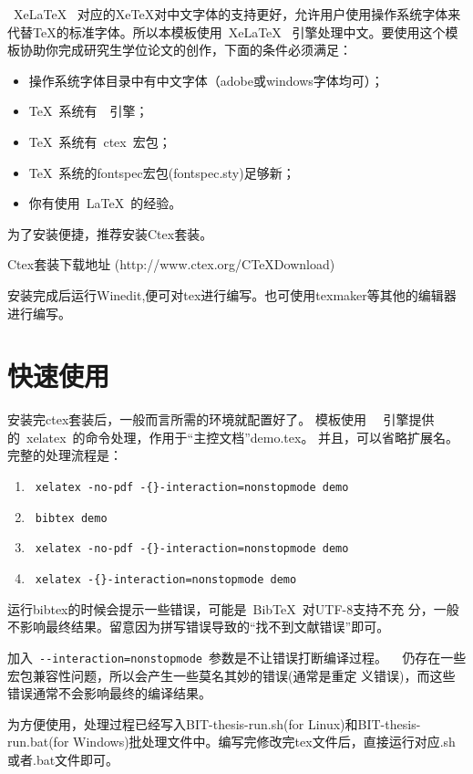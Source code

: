 ~XeLaTeX~ 对应的XeTeX对中文字体的支持更好，允许用户使用操作系统字体来代替TeX的标准字体。所以本模板使用~XeLaTeX~ 引擎处理中文。要使用这个模板协助你完成研究生学位论文的创作，下面的条件必须满足：

\begin{itemize}
\item \inv 操作系统字体目录中有中文字体（adobe或windows字体均可）；
\item \inv \TeX~系统有~\XeTeX~引擎；
\item \inv \TeX~系统有~ctex~宏包；
\item \inv \TeX~系统的fontspec宏包(fontspec.sty)足够新；
\item \inv 你有使用~\LaTeX~的经验。
\end{itemize}

为了安装便捷，推荐安装Ctex套装。

Ctex套装下载地址 (http://www.ctex.org/CTeXDownload)


安装完成后运行Winedit,便可对tex进行编写。也可使用texmaker等其他的编辑器进行编写。

\section{快速使用}
\label{sec:process}

安装完ctex套装后，一般而言所需的环境就配置好了。
模板使用~\XeTeX~ 引擎提供的~xelatex~的命令处理，作用于“主控文档”demo.tex。
并且，可以省略扩展名。完整的处理流程是：

{\color{blue}
\begin{enumerate}
\item[] ~\verb|xelatex -no-pdf -{}-interaction=nonstopmode demo|
\item[] ~\verb|bibtex demo| 
\item[] ~\verb|xelatex -no-pdf -{}-interaction=nonstopmode demo|
\item[] ~\verb|xelatex -{}-interaction=nonstopmode demo|
\end{enumerate}}

运行bibtex的时候会提示一些错误，可能是~{{\sc Bib}\TeX}~对UTF-8支持不充
分，一般不影响最终结果。留意因为拼写错误导致的``找不到文献错误''即可。

加入~\verb|--interaction=nonstopmode|~参数是不让错误打断编译过程。
\XeTeX~ 仍存在一些宏包兼容性问题，所以会产生一些莫名其妙的错误(通常是重定
义错误)，而这些错误通常不会影响最终的编译结果。
  
为方便使用，处理过程已经写入BIT-thesis-run.sh(for Linux)和BIT-thesis-run.bat(for Windows)批处理文件中。编写完修改完tex文件后，直接运行对应.sh或者.bat文件即可。



